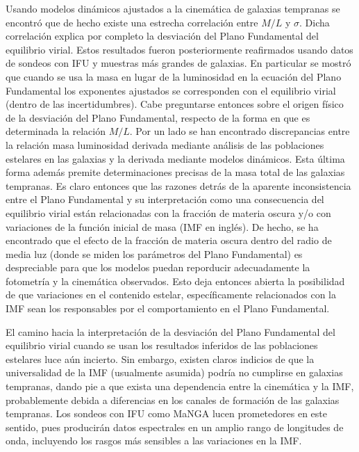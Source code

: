 \documentclass[a4paper,twoside]{article}
\begin{document}
Usando modelos dinámicos ajustados a la cinemática de galaxias tempranas se encontró que de hecho existe una estrecha correlación entre $M/L$ y $\sigma$. Dicha correlación explica por completo la desviación del Plano Fundamental del equilibrio virial. Estos resultados fueron posteriormente reafirmados usando datos de sondeos con IFU y muestras más grandes de galaxias. En particular se mostró que cuando se usa la masa en lugar de la luminosidad en la ecuación del Plano Fundamental los exponentes ajustados se corresponden con el equilibrio virial (dentro de las incertidumbres).  Cabe preguntarse entonces sobre el origen físico de la desviación del Plano Fundamental, respecto de la forma en que es determinada la relación $M/L$. Por un lado se han encontrado discrepancias entre la relación masa luminosidad derivada mediante análisis de las poblaciones estelares en las galaxias y la derivada mediante modelos dinámicos. Esta última forma además premite determinaciones precisas de la masa total de las galaxias tempranas. Es claro entonces que las razones detrás de la aparente inconsistencia entre el Plano Fundamental y su interpretación como una consecuencia del equilibrio virial están relacionadas con la fracción de materia oscura y/o con variaciones de la función inicial de masa (IMF en inglés). De hecho, se ha encontrado que el efecto de la fracción de materia oscura dentro del radio de media luz (donde se miden los parámetros del Plano Fundamental) es despreciable para que los modelos puedan reporducir adecuadamente la fotometría y la cinemática observados. Esto deja entonces abierta la posibilidad de que variaciones en el contenido estelar, específicamente relacionados con la IMF sean los responsables por el comportamiento en el Plano Fundamental.

El camino hacia la interpretación de la desviación del Plano Fundamental del equilibrio virial cuando se usan los resultados inferidos de las poblaciones estelares luce aún incierto. Sin embargo, existen claros indicios de que la universalidad de la IMF (usualmente asumida) podría no cumplirse en galaxias tempranas, dando pie a que exista una dependencia entre la cinemática y la IMF, probablemente debida a diferencias en los canales de formación de las galaxias tempranas. Los sondeos con IFU como MaNGA lucen prometedores en este sentido, pues producirán datos espectrales en un amplio rango de longitudes de onda, incluyendo los rasgos más sensibles a las variaciones en la IMF.
\end{document}
